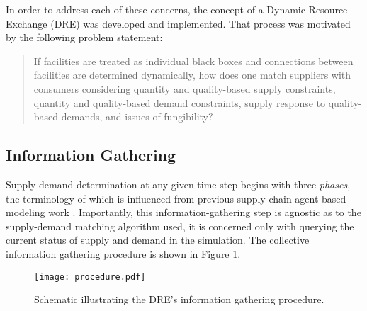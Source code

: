 In order to address each of these concerns, the concept of a Dynamic Resource
Exchange (DRE) was developed and implemented. That process was motivated by the
following problem statement:

\begin{quote}
    If facilities are treated as individual black boxes and connections between
    facilities are determined dynamically, how does one match suppliers with
    consumers considering quantity and quality-based supply constraints,
    quantity and quality-based demand constraints, supply response to
    quality-based demands, and issues of fungibility?
\end{quote}

\subsection{Information Gathering}\label{abm:dre:info}

Supply-demand determination at any given time step begins with three
\textit{phases}, the terminology of which is influenced from previous supply
chain agent-based modeling work \cite{julka_agent-based_2002}. Importantly, this
information-gathering step is agnostic as to the supply-demand matching
algorithm used, it is concerned only with querying the current status of supply
and demand in the simulation. The collective information gathering procedure is
shown in Figure \ref{fig:procedure}.

\begin{figure}
  \begin{center}
    \texttt{[image: procedure.pdf]}
    \caption[]{\label{fig:procedure}
        Schematic illustrating the DRE's information gathering procedure.}
  \end{center}
\end{figure}

